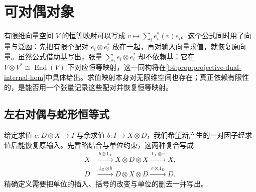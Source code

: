 
\section{可对偶对象}
\label{b4:sec:monoidal-duals}

有限维向量空间 \(V\) 的恒等映射可以写成 \(v\mapsto\sum_i e_i^*(v)e_i\)。这个公式同时用了向量与泛函：先把有限个配对 \(e_i\otimes e_i^*\) 放在一起，再对输入向量求值，就恢复原向量。虽然公式借助基写出，张量 \(\sum_i e_i\otimes e_i^*\) 却不依赖基：它在 \(V\otimes V^*\cong\operatorname{End}(V)\) 下对应恒等映射，这一同构将在\cref{b4:prop:projective-dual-internal-hom}中具体给出。求值映射本身对无限维空间也存在；真正依赖有限性的，是能否用一个张量记录这些配对并恢复恒等映射。

\subsection{左右对偶与蛇形恒等式}
\label{b4:subsec:monoidal-left-right-duals}

给定求值 \(e:D\otimes X\to I\) 与余求值 \(b:I\to X\otimes D\)，我们希望新产生的一对因子经求值后能恢复原输入。先暂略结合与单位约束，这两种复合写成
\[
	\begin{aligned}
		X&\xrightarrow{\ b\otimes1_X\ }X\otimes D\otimes X \xrightarrow{\ 1_X\otimes e\ }X,\\
		D&\xrightarrow{\ 1_D\otimes b\ }D\otimes X\otimes D \xrightarrow{\ e\otimes1_D\ }D.
	\end{aligned}
\]
精确定义需要把单位的插入、括号的改变与单位的删去一并写出。

